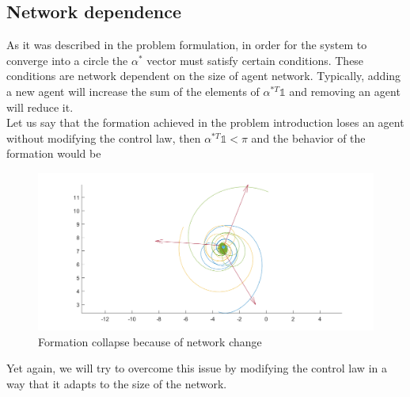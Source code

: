 \subsection{Network dependence}
As it was described in the problem formulation, in order for the system to converge into a circle the $\alpha^*$ vector must satisfy certain conditions. These conditions are network dependent on the size of agent network. Typically, adding a new agent will increase the sum of the elements of $\alpha^{*T} \mathbb{1}$ and removing an agent will reduce it.
\\

Let us say that the formation achieved in the problem introduction loses an agent without modifying the control law, then $\alpha^{*T} \mathbb{1}<\pi$ and the behavior of the formation would be
\begin{figure}[H]
	\includegraphics[width=\linewidth]{Attachments/Figure33.png}
	\caption{Formation collapse because of network change}
	\label{fig:Collapse}
\end{figure}

Yet again, we will try to overcome this issue by modifying the control law in a way that it adapts to the size of the network.

